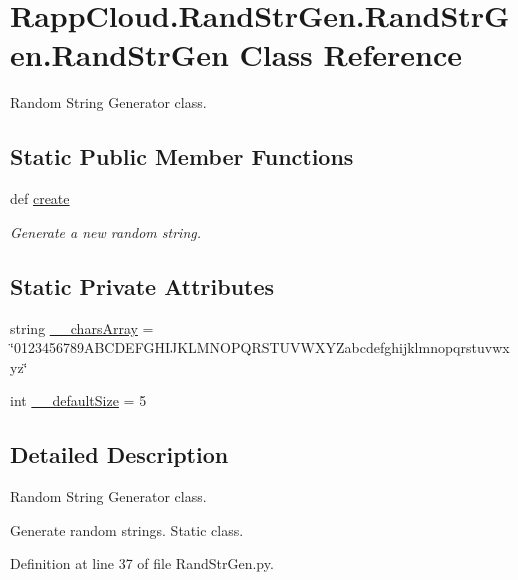 \hypertarget{classRappCloud_1_1RandStrGen_1_1RandStrGen_1_1RandStrGen}{\section{Rapp\-Cloud.\-Rand\-Str\-Gen.\-Rand\-Str\-Gen.\-Rand\-Str\-Gen Class Reference}
\label{classRappCloud_1_1RandStrGen_1_1RandStrGen_1_1RandStrGen}
}


Random String Generator class.  


\subsection*{Static Public Member Functions}
\begin{DoxyCompactItemize}
\item 
def \hyperlink{classRappCloud_1_1RandStrGen_1_1RandStrGen_1_1RandStrGen_a01ff220df1c78e9327cd457488238dd8}{create}
\begin{DoxyCompactList}\small\item\em Generate a new random string. \end{DoxyCompactList}\end{DoxyCompactItemize}
\subsection*{Static Private Attributes}
\begin{DoxyCompactItemize}
\item 
string \hyperlink{classRappCloud_1_1RandStrGen_1_1RandStrGen_1_1RandStrGen_a32d1c283b60428c2496f00682437b4fc}{\-\_\-\-\_\-chars\-Array} = \char`\"{}0123456789\-A\-B\-C\-D\-E\-F\-G\-H\-I\-J\-K\-L\-M\-N\-O\-P\-Q\-R\-S\-T\-U\-V\-W\-X\-Y\-Zabcdefghijklmnopqrstuvwxyz\char`\"{}
\item 
int \hyperlink{classRappCloud_1_1RandStrGen_1_1RandStrGen_1_1RandStrGen_a7925ff32ee60a9ba23e585c4a96f050c}{\-\_\-\-\_\-default\-Size} = 5
\end{DoxyCompactItemize}


\subsection{Detailed Description}
Random String Generator class. 

Generate random strings. Static class. 

Definition at line 37 of file Rand\-Str\-Gen.\-py.



